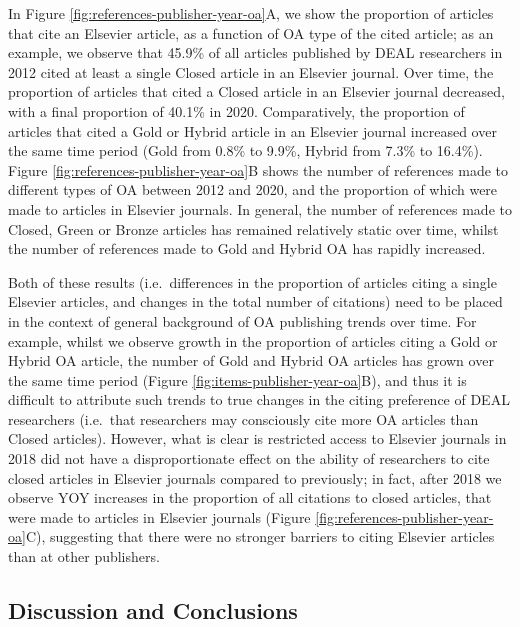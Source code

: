 \documentclass[
]{article}
\begin{document}
In Figure \ref{fig:references-publisher-year-oa}A, we show the proportion of articles that cite an Elsevier article, as a function of OA type of the cited article; as an example, we observe that 45.9\% of all articles published by DEAL researchers in 2012 cited at least a single Closed article in an Elsevier journal. Over time, the proportion of articles that cited a Closed article in an Elsevier journal decreased, with a final proportion of 40.1\% in 2020. Comparatively, the proportion of articles that cited a Gold or Hybrid article in an Elsevier journal increased over the same time period (Gold from 0.8\% to 9.9\%, Hybrid from 7.3\% to 16.4\%). Figure \ref{fig:references-publisher-year-oa}B shows the number of references made to different types of OA between 2012 and 2020, and the proportion of which were made to articles in Elsevier journals. In general, the number of references made to Closed, Green or Bronze articles has remained relatively static over time, whilst the number of references made to Gold and Hybrid OA has rapidly increased.

Both of these results (i.e.~differences in the proportion of articles citing a single Elsevier articles, and changes in the total number of citations) need to be placed in the context of general background of OA publishing trends over time. For example, whilst we observe growth in the proportion of articles citing a Gold or Hybrid OA article, the number of Gold and Hybrid OA articles has grown over the same time period (Figure \ref{fig:items-publisher-year-oa}B), and thus it is difficult to attribute such trends to true changes in the citing preference of DEAL researchers (i.e.~that researchers may consciously cite more OA articles than Closed articles). However, what is clear is restricted access to Elsevier journals in 2018 did not have a disproportionate effect on the ability of researchers to cite closed articles in Elsevier journals compared to previously; in fact, after 2018 we observe YOY increases in the proportion of all citations to closed articles, that were made to articles in Elsevier journals (Figure \ref{fig:references-publisher-year-oa}C), suggesting that there were no stronger barriers to citing Elsevier articles than at other publishers.

\hypertarget{discussion-and-conclusions}{%
\subsection{Discussion and Conclusions}\label{discussion-and-conclusions}}
\end{document}
